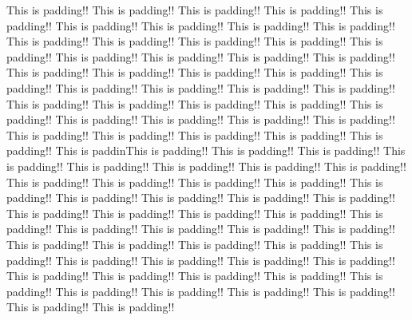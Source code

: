 This is padding!! 
This is padding!! 
This is padding!! 
This is padding!! 
This is padding!! 
This is padding!! 
This is padding!! 
This is padding!! 
This is padding!! 
This is padding!! 
This is padding!! 
This is padding!! 
This is padding!! 
This is padding!! 
This is padding!! 
This is padding!! 
This is padding!! 
This is padding!! 
This is padding!! 
This is padding!! 
This is padding!! 
This is padding!! 
This is padding!! 
This is padding!! 
This is padding!! 
This is padding!! 
This is padding!! 
This is padding!! 
This is padding!! 
This is padding!! 
This is padding!! 
This is padding!! 
This is padding!! 
This is padding!! 
This is padding!! 
This is padding!! 
This is padding!! 
This is padding!! 
This is padding!! 
This is padding!! 
This is padding!! 
This is paddinThis is padding!! 
This is padding!! 
This is padding!! 
This is padding!! 
This is padding!! 
This is padding!! 
This is padding!! 
This is padding!! 
This is padding!! 
This is padding!! 
This is padding!! 
This is padding!! 
This is padding!! 
This is padding!! 
This is padding!! 
This is padding!! 
This is padding!! 
This is padding!! 
This is padding!! 
This is padding!! 
This is padding!! 
This is padding!! 
This is padding!! 
This is padding!! 
This is padding!! 
This is padding!! 
This is padding!! 
This is padding!! 
This is padding!! 
This is padding!! 
This is padding!! 
This is padding!! 
This is padding!! 
This is padding!! 
This is padding!! 
This is padding!! 
This is padding!! 
This is padding!! 
This is padding!! 
This is padding!! 
This is padding!! 
This is padding!! 
This is padding!! 
This is padding!! 
This is padding!! 
This is padding!! 